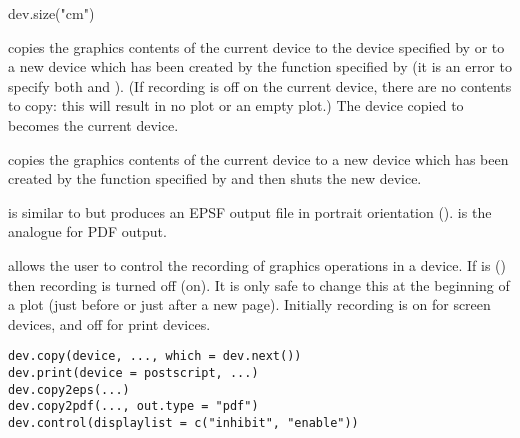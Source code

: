 %
\begin{Examples}
\begin{ExampleCode}
dev.size("cm")
\end{ExampleCode}
\end{Examples}
%
\begin{Description}\relax
{} copies the graphics contents of the current device
to the device specified by  or to a new device which has
been created by the function specified by  (it is an
error to specify both  and ).  (If recording
is off on the current device, there are no contents to copy: this will
result in no plot or an empty plot.)
The device copied to becomes the current device.

 copies the graphics contents of the current device
to a new device which has been created by the function specified by
 and then shuts the new device.

 is similar to  but produces an
EPSF output file in portrait orientation ().
 is the analogue for PDF output.

 allows the user to control the recording of
graphics operations in a device.  If  is 
() then recording is turned off (on). It is only safe
to change this at the beginning of a plot (just before or just after a
new page).  Initially recording is on for screen devices, and off for
print devices.
\end{Description}
%
\begin{Usage}
\begin{verbatim}
dev.copy(device, ..., which = dev.next())
dev.print(device = postscript, ...)
dev.copy2eps(...)
dev.copy2pdf(..., out.type = "pdf")
dev.control(displaylist = c("inhibit", "enable"))
\end{verbatim}
\end{Usage}
%
